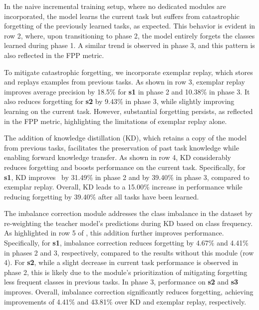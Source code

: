 

 In the naive incremental training setup, where no dedicated modules are incorporated, the model learns the current task but suffers from catastrophic forgetting of the previously learned tasks, as expected. This behavior is evident in row 2, where, upon transitioning to phase 2, the model entirely forgets the classes learned during phase 1. A similar trend is observed in phase 3, and this pattern is also reflected in the FPP metric.

 To mitigate catastrophic forgetting, we incorporate exemplar replay, which stores and replays examples from previous tasks. As shown in row 3, exemplar replay improves average precision by 18.5\% for \textbf{s1} in phase 2 and 10.38\% in phase 3. It also reduces forgetting for \textbf{s2} by 9.43\% in phase 3, while slightly improving learning on the current task. However, substantial forgetting persists, as reflected in the FPP metric, highlighting the limitations of exemplar replay alone.

 The addition of knowledge distillation (KD), which retains a copy of the model from previous tasks, facilitates the preservation of past task knowledge while enabling forward knowledge transfer. As shown in row 4, KD considerably reduces forgetting and boosts performance on the current task. Specifically, for \textbf{s1}, KD improves \mapft~by 31.49\% in phase 2 and by 39.40\% in phase 3, compared to exemplar replay. Overall, KD leads to a 15.00\% increase in performance while reducing forgetting by 39.40\% after all tasks have been learned.

 The imbalance correction module addresses the class imbalance in the dataset by re-weighting the teacher model’s predictions during KD based on class frequency. As highlighted in row 5 of , this addition further improves performance. Specifically, for \textbf{s1}, imbalance correction reduces forgetting by 4.67\% and 4.41\% in phases 2 and 3, respectively, compared to the results without this module (row 4). For \textbf{s2}, while a slight decrease in current task performance is observed in phase 2, this is likely due to the module’s prioritization of mitigating forgetting less frequent classes in previous tasks. In phase 3, performance on \textbf{s2} and \textbf{s3} improves. Overall, imbalance correction significantly reduces forgetting, achieving improvements of 4.41\% and 43.81\% over KD and exemplar replay, respectively.
